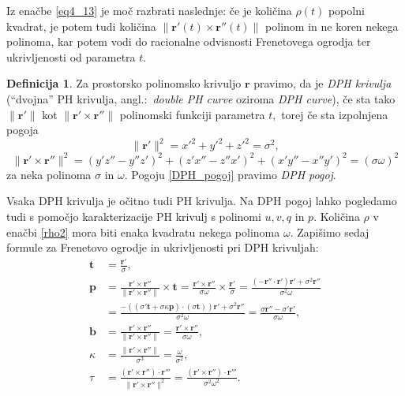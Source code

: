 \documentclass[12pt,a4paper,twoside]{article}
\theoremstyle{definition} %
\newtheorem{definicija}{Definicija}[section]
\theoremstyle{plain} %
\theoremstyle{primerstyle}
\numberwithin{equation}{section}  %
\newcommand{\tV}{\mathbf{t}}
\newcommand{\bV}{\mathbf{b}}
\newcommand{\pV}{\mathbf{p}}
\newcommand{\rV}{\mathbf{r}}
\begin{document}
Iz enačbe \eqref{eq4_13} je moč razbrati naslednje: če je količina $\rho(t)$ popolni kvadrat, je potem tudi količina $\lVert \rV'(t) \times \rV''(t) \rVert$ polinom in ne koren nekega polinoma, kar potem vodi do racionalne odvisnosti Frenetovega ogrodja ter ukrivljenosti od parametra $t.$
\begin{definicija}
	\label{dvojnaPH}
	Za prostorsko polinomsko krivuljo $\rV$ pravimo, da je \emph{DPH krivulja} (``dvojna'' PH krivulja, angl.:\ \emph{double PH curve} oziroma \emph{DPH curve}), če sta tako $\lVert \rV' \rVert$ kot $\lVert \rV' \times \rV'' \rVert$ polinomski funkciji parametra $t,$ torej če sta izpolnjena pogoja
	\begin{equation}
		\lVert \rV' \rVert^2=x'^2+y'^2+z'^2=\sigma^2,
	\end{equation}
	\begin{equation}
		\label{DPH_pogoj}
		\lVert \rV' \times \rV'' \rVert^2=(y'z''-y''z')^2+(z'x''-z''x')^2+(x'y''-x''y')^2=(\sigma \omega)^2
	\end{equation}
	za neka polinoma $\sigma$ in $\omega.$ Pogoju \eqref{DPH_pogoj} pravimo \emph{DPH pogoj}.
\end{definicija}
Vsaka DPH krivulja je očitno tudi PH krivulja. Na DPH pogoj lahko pogledamo tudi s pomočjo karakterizacije PH krivulj s polinomi $u,v,q$ in $p.$ Količina $\rho$ v enačbi \eqref{rho2} mora biti enaka kvadratu nekega polinoma $\omega.$ Zapišimo sedaj formule za Frenetovo ogrodje in ukrivljenosti pri DPH krivuljah:
\begin{align}
	\tV&=\frac{\rV'}{\sigma}, \nonumber \\
	\pV&=\frac{\rV'\times \rV''}{\lVert \rV'\times \rV'' \rVert} \times \tV =\frac{\rV'\times \rV''}{\sigma \omega}\times \frac{\rV'}{\sigma}=\frac{(-\rV'' \cdot \rV')\rV'+\sigma^2\rV''}{\sigma^2\omega} \nonumber \\
	&=\frac{-((\sigma'\tV+\sigma \kappa \pV)\cdot(\sigma\tV))\rV'+\sigma^2\rV''}{\sigma^2\omega}=\frac{\sigma\rV''-\sigma'\rV'}{\sigma\omega},\label{DPH_frenet_ukrv} \\
	\bV&=\frac{\rV'\times \rV''}{\lVert \rV'\times \rV'' \rVert}=\frac{\rV'\times \rV''}{\sigma\omega}, \nonumber \\
	\kappa &= \frac{\lVert \rV'\times \rV'' \rVert}{\sigma^3}=\frac{\omega}{\sigma^2}, \nonumber \\
	\tau &= \frac{(\rV'\times\rV'')\cdot\rV'''}{\lVert \rV'\times \rV'' \rVert^2}=\frac{(\rV'\times\rV'')\cdot\rV'''}{\sigma^2\omega^2}.\nonumber
\end{align}
\end{document}
